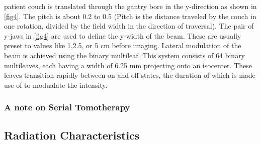 \documentclass[10pt,journal,compsoc]{IEEEtran} %
\begin{document}
  patient couch is translated through the gantry bore in the y-direction as 
  shown in \ref{fig4}\protect{}. The pitch is about 0.2 to 0.5 
  (Pitch is the distance traveled by the couch in one rotation, divided by the 
  field width in the direction of traversal). The pair of y-jaws in 
  \ref{fig4}\protect{} are used to define the y-width of the beam. 
  These are usually preset to values like 1,2.5, or 5 cm before imaging. 
  Lateral modulation of the beam is achieved using the binary multileaf. This 
  system consists of 64 binary multileaves, each having a width of 6.25 mm 
  projecting onto an isocenter. These leaves transition rapidly between on 
  and off states, the duration of which is made use of to modualate the 
  intensity. 
  \subsubsection{A note on Serial Tomotherapy}
  \subsection{Radiation Characteristics}
  \label{radiation}
\end{document}
